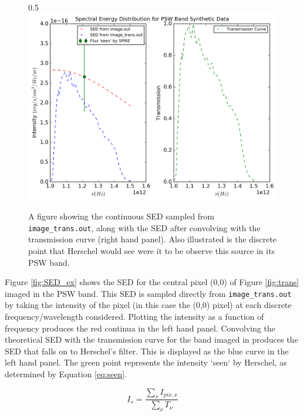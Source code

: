 \documentclass{report}
\begin{document}
\begin{figure}[h]{0.5\textwidth}
  \centering
  \includegraphics[scale=0.5]{../img/spectrum_psw_unweighted_v2}
  \caption[A figure showing the continuous SED sampled from \texttt{image\_trans.out}, along with the SED after convolving with the transmission curve (right hand panel). Also illustrated is the discrete point that Herschel would see were it to be observe this source in its PSW band.]{A figure showing the continuous SED sampled from \texttt{image\_trans.out}, along with the SED after convolving with the transmission curve (right hand panel). Also illustrated is the discrete point that Herschel would see were it to be observe this source in its PSW band.}
\end{figure}\label{fig:SED_ex}

Figure \ref{fig:SED_ex} shows the SED for the central pixel (0,0) of Figure \ref{fig:trans} imaged in the PSW band. This SED is sampled directly from \texttt{image\_trans.out} by taking the intensity of the pixel (in this case the (0,0) pixel) at each discrete frequency/wavelength considered. Plotting the intensity as a function of frequency produces the red continua in the left hand panel. Convolving the theoretical SED with the transmission curve for the band imaged in produces the SED that falls on to Herschel's filter. This is displayed as the blue curve in the left hand panel. The green point represents the intensity `seen` by Herschel, as determined by Equation \ref{eq:seen}.

\begin{equation}
  I_{s} = \frac{\sum_{\nu} I_{pix,\nu}}{\sum_{\nu} T_{\nu}}
\end{equation} \label{eq:seen}
\end{document}
